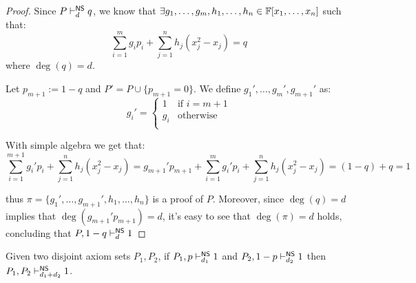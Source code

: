 \begin{proof}
    
    Since $P \vdash^{\mathsf{NS}}_d q$, we know that $\exists g_1, \ldots, g_m, h_1, \ldots, h_n \in \mathbb{F}[x_1, \ldots, x_n]$ such that:
    \[\sum_{i = 1}^m g_i p_i + \sum_{j = 1}^n h_j (x_j^2-x_j) = q\]
    where $\deg(q) = d$.

    Let $p_{m+1} := 1-q$ and $P' = P \cup \{p_{m+1} = 0\}$. We define $g_1', \ldots, g_m', g_{m+1}'$ as:
    \[g_i' = \left \{ \begin{array}{ll}
        1 & \text{if } i = m+1 \\
        g_i & \text{otherwise}  \\
    \end{array}\right .\]
    
    With simple algebra we get that:
    \[\sum_{i = 1}^{m+1} g_i' p_i + \sum_{j = 1}^n h_j (x_j^2-x_j) = g_{m+1}'p_{m+1} + \sum_{i = 1}^{m} g_i' p_i + \sum_{j = 1}^n h_j (x_j^2-x_j) = (1-q) + q = 1\]
    
    thus $\pi = \{g_1', \ldots, g_{m+1}', h_1, \ldots, h_n\}$ is a proof of $P$. Moreover, since $\deg(q) = d$ implies that $\deg(g_{m+1}'p_{m+1}) = d$, it's easy to see that $\deg(\pi) = d$ holds, concluding that $P, 1-q \vdash_d^{\mathsf{NS}} 1$

\end{proof}

\begin{lemma}
    \label{union_ref}
    Given two disjoint axiom sets $P_1, P_2$, if $P_1, p \vdash_{d_1}^{\mathsf{NS}} 1$ and $P_2, 1-p \vdash_{d_2}^{\mathsf{NS}} 1$ then $P_1, P_2 \vdash_{d_1+ d_2}^{\mathsf{NS}}  1$.
\end{lemma}

